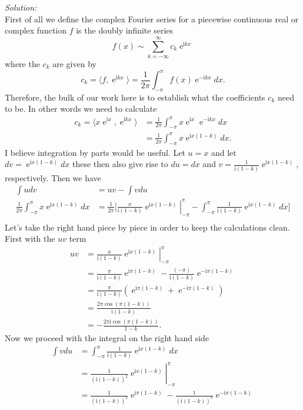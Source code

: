 \documentclass[10pt]{amsart}
\newcommand{\I}{\mathrm{i}}
\DeclareMathOperator{\E}{e}
\theoremstyle{nonumberplain}
\begin{document}
\begin{enumerate}[label={\bf {\arabic*}:}]
\begin{enumerate}
\noindent
\textit{Solution:} \\
First of all we define the complex Fourier series for a piecewise continuous real or complex function $f$ is the doubly infinite series
$$
f(x) \sim \sum_{k=-\infty}^{\infty} c_k \E^{\I k x}
$$
where the $c_k$ are given by
$$
c_k = \langle f, \E^{\I k x} \rangle = \frac 1 {2 \pi} \int_{-\pi}^{\pi} f(x) \E^{-\I k x} dx.
$$
Therefore, the bulk of our work here is to establish what the coefficients $c_k$ need to be.
In other words we need to calculate
\begin{align*}
c_k = \langle x\E^{\I x}, \E^{\I k x} \rangle
	&= \frac 1 {2 \pi} \int_{-\pi}^{\pi} x\E^{\I x} \E^{-\I k x} dx \\
	&= \frac 1 {2 \pi} \int_{-\pi}^{\pi} x\E^{\I x (1 - k)}dx.
\end{align*}
I believe integration by parts would be useful.
Let $u = x$ and let $dv = \E^{\I x (1 - k)}dx$ these then also give rise to $du = dx$ and $v = \frac 1 {\I(1 - k)} \E^{\I x (1 - k)}$, respectively.
Then we have
\begin{align*}
\int u dv &= uv - \int v du \\
\frac 1 {2 \pi} \int_{-\pi}^{\pi} x\E^{\I x (1 - k)}dx
	&= \frac 1 {2 \pi} \Bigg[ \left. \frac x {\I(1 - k)} \E^{\I x (1 - k)}\right|_{-\pi}^{\pi} - \int_{-\pi}^{\pi} \frac 1 {\I(1 - k)} \E^{\I x (1 - k)} dx \Bigg] \\
\end{align*}
Let's take the right hand piece by piece in order to keep the calculations clean.
First with the $uv$ term
\begin{align*}
uv &= \left. \frac x {\I(1 - k)} \E^{\I x (1 - k)}\right|_{-\pi}^{\pi} \\
	&= \frac \pi {\I(1 - k)} \E^{\I \pi (1 - k)} - \frac {(-\pi)} {\I(1 - k)} \E^{- \I \pi (1 - k)} \\
	&= \frac \pi {\I(1 - k)} \left( \E^{\I \pi (1 - k)} + \E^{- \I \pi (1 - k)} \right) \\
	&= \frac {2 \pi \cos (\pi (1 - k)) } {\I(1 - k)} \\
	&= - \frac {2 \pi \I \cos (\pi (1 - k)) } {1 - k}.
\end{align*}
Now we proceed with the integral on the right hand side
\begin{align*}
\int v du &= \int_{-\pi}^{\pi} \frac 1 {\I(1 - k)} \E^{\I x (1 - k)} dx \\
	&= \left. \frac 1 {(\I(1 - k))^2} \E^{\I x (1 - k)} \right|_{-\pi}^{\pi} \\
	&= \frac 1 {(\I(1 - k))^2} \E^{\I \pi (1 - k)} - \frac 1 {(\I(1 - k))^2} \E^{- \I \pi (1 - k)} \\

\end{align*}
\end{enumerate}
\end{enumerate}
\end{document}
